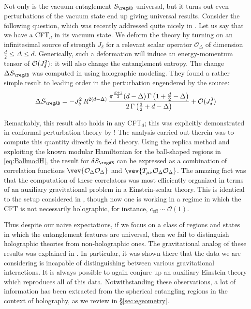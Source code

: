 \documentclass[12pt,openany]{book}
\begin{document}
Not only is the vacuum entaglement $S_{\regAB}$ universal, but it turns out even perturbations of the vacuum state end up giving universal results. Consider the following question, which was recently addressed quite nicely in \cite{Faulkner:2014jva}. Let us say that we have a CFT$_d$ in its vacuum state.  We deform the theory by turning on an infinitesimal source of strength
$J_\delta$ for a relevant scalar operator $\mathcal{O}_\Delta$ of dimension
$\frac{d}{2} \leq \Delta \leq d$. Generically, such a deformation will induce an energy-momentum tensor of ${\cal O}  (J_\delta^2)$; it will also change the entanglement entropy. The change $\Delta S_{\regAB}$ was computed in \cite{Liu:2012eea} using holographic modeling. They found a rather simple result to leading order in the perturbation engendered by the source:
%
\begin{equation}
\Delta S_{\regAB} =  -J_\delta^2 \, R^{2(d-\Delta)} \, \frac{\pi^\frac{d+1}{2} (d-\Delta) \, \Gamma\left(1+ \frac{d}{2} -\Delta\right)}{2\, \Gamma\left(\frac{3}{2} + d-\Delta\right)} + \mathcal{O}( J_\delta^3)
\label{eq:liumrefined}
\end{equation}
%

Remarkably, this result also holds in any CFT$_d$; this was explicitly demonstrated in conformal perturbation theory by \cite{Faulkner:2014jva}! The analysis carried out therein was to compute this quantity directly in field theory. Using the replica method and exploiting the known modular Hamiltonian for the ball-shaped regions  in \eqref{eq:BallmodH}, the result for $\delta S_{\regAB}$ can be expressed as a combination of correlation functions $\vev{\mathcal{O}_\Delta \mathcal{O}_\Delta}$ and $\vev{T_{\mu \nu} \mathcal{O}_\Delta\mathcal{O}_\Delta}$.
The amazing fact was that the computation of these correlators was most efficiently organized in terms of an auxiliary gravitational problem in a Einstein-scalar theory. This is identical to the setup considered in  \cite{Liu:2012eea}, though now one is working in a regime in which the CFT is not necessarily holographic, for instance, $c_\text{eff}\sim \mathcal{O}(1)$.

Thus despite our naive expectations, if we focus on a class of regions and states in which the entanglement features are universal, then we fail to distinguish holographic theories from non-holographic ones. The gravitational analog of these results was explained in \cite{Haehl:2015rza}. In particular, it was shown there that the data we are considering is incapable of distinguishing between various gravitational interactions. It is always possible to again conjure up an auxiliary Einstein theory which reproduces all of this data. Notwithstanding these observations, a lot of information has been extracted from the spherical entangling regions in the context of holography, as we review in \S\ref{sec:egeometry}.
\end{document}
